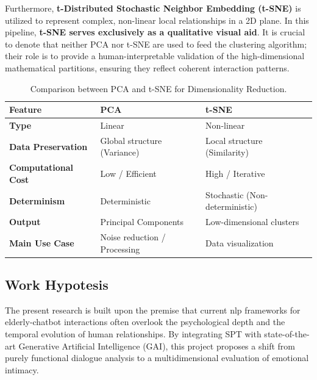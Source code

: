 Furthermore, \textbf{t-Distributed Stochastic Neighbor Embedding (t-SNE)} is utilized to represent complex, non-linear local relationships in a 2D plane. In this pipeline, \textbf{t-SNE serves exclusively as a qualitative visual aid}. It is crucial to denote that neither PCA nor t-SNE are used to feed the clustering algorithm; their role is to provide a human-interpretable validation of the high-dimensional mathematical partitions, ensuring they reflect coherent interaction patterns.



\begin{table}[htbp]
\centering
\caption{Comparison between PCA and t-SNE for Dimensionality Reduction.}
\label{tab:pca_vs_tsne}
\begin{tabular}{@{}lll@{}}
\toprule
\textbf{Feature}          & \textbf{PCA}                  & \textbf{t-SNE}                 \\ \midrule
\textbf{Type}             & Linear                        & Non-linear                     \\
\textbf{Data Preservation}& Global structure (Variance)   & Local structure (Similarity)   \\
\textbf{Computational Cost}& Low / Efficient               & High / Iterative               \\
\textbf{Determinism}      & Deterministic                 & Stochastic (Non-deterministic) \\
\textbf{Output}           & Principal Components          & Low-dimensional clusters       \\
\textbf{Main Use Case}    & Noise reduction / Processing  & Data visualization             \\ \bottomrule
\end{tabular}
\end{table}

\newpage
        
    

\subsection{Work Hypotesis}

\label{sec:hypothesis}

The present research is built upon the premise that current nlp frameworks for elderly-chatbot interactions often overlook the psychological depth and the temporal evolution of human relationships. By integrating SPT with state-of-the-art Generative Artificial Intelligence (GAI), this project proposes a shift from purely functional dialogue analysis to a multidimensional evaluation of emotional intimacy.

